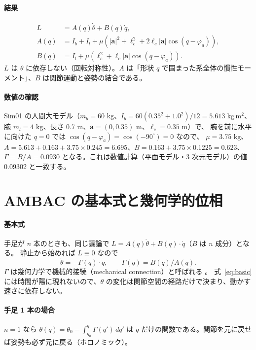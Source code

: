 \paragraph{結果}
\begin{equation}\boxed{
\begin{aligned}
L &= A(q)\dot\theta + B(q)\dot q,\\
A(q) &= I_b + I_l + \mu\left(|\bm a|^2+\ell_c^2+2\ell_c|\bm a|\cos(q-\varphi_a)\right),\\
B(q) &= I_l + \mu\left(\ell_c^2+\ell_c|\bm a|\cos(q-\varphi_a)\right).
\end{aligned}}\label{eq:AB-closed}
\end{equation}
$L$ は $\theta$ に依存しない（回転対称性）。$A$ は「形状 $q$ で固まった系全体の慣性モーメント」、$B$ は関節運動と姿勢の結合である。

\paragraph{数値の確認}
Sim01 の人間大モデル（$m_b=60$ kg、$I_b=60(0.35^2+1.0^2)/12=5.613$ kg\,m$^2$、腕 $m_l=4$ kg、長さ 0.7 m、$\bm a=(0,0.35)$ m、$\ell_c=0.35$ m）で、
腕を前に水平に向けた $q=0$ では $\cos(q-\varphi_a)=\cos(-90^\circ)=0$ なので、
$\mu=3.75$ kg、$A = 5.613+0.163+3.75\times0.245 = 6.695$、$B = 0.163+3.75\times0.1225=0.623$、
$\Gamma=B/A=0.0930$ となる。これは数値計算（平面モデル・3 次元モデル）の値 0.09302 と一致する。

\section{AMBAC の基本式と幾何学的位相}\label{app:connection}

\paragraph{基本式}
手足が $n$ 本のときも、同じ議論で $L = A(q)\dot\theta + B(q)\cdot\dot q$（$B$ は $n$ 成分）となる。
静止から始めれば $L\equiv 0$ なので
\begin{equation}
\dot\theta = -\Gamma(q)\cdot\dot q,\qquad \Gamma(q) = B(q)/A(q). \label{eq:basic}
\end{equation}
$\Gamma$ は幾何力学で機械的接続（mechanical connection）と呼ばれる \cite{R5,R4}。
式~\eqref{eq:basic} には時間が陽に現れないので、$\theta$ の変化は関節空間の経路だけで決まり、動かす速さに依存しない。

\paragraph{手足 1 本の場合}
$n=1$ なら $\theta(q) = \theta_0 - \int_{q_0}^{q}\Gamma(q')\,dq'$ は $q$ だけの関数である。関節を元に戻せば姿勢も必ず元に戻る（ホロノミック）。

